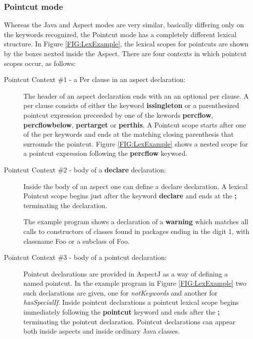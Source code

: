 \subsubsection{{\sc Pointcut} mode}
Whereas the {\sc Java} and {\sc Aspect} modes are very similar, basically
differing only on the keywords recognized, the {\sc Pointcut} mode
has a completely different lexical structure.   
In Figure \ref{FIG:LexExample},  the lexical scopes for pointcuts are
shown by the boxes nexted inside the Aspect.   There are four contexts in
which pointcut scopes occur, as follows:

\begin{description}
\item[Pointcut Context \#1 - a Per clause in an aspect declaration:]
The header of an aspect
declaration ends with an an optional per clause.  A per clause consists
of either the keyword {\bf issingleton} or  a parenthesized pointcut
expression preceeded by one of the kewords {\bf percflow}, 
{\bf percflowbelow}, {\bf pertarget} or {\bf perthis}.    
A {\sc Pointcut} scope starts after one of the per keywords and ends at
the matching closing parenthesis that surrounds the pointcut.   Figure
\ref{FIG:LexExample} shows a nested scope for a pointcut expression 
following the {\bf percflow} keyword.

\item[Pointcut Context \#2 - body of a {\bf declare} declaration:]
Inside the body of an aspect one can define
a declare declaration.   A lexical {\sc Pointcut} scope begins just after
the keyword {\bf declare} and ends at the {\bf ;} terminating the 
declaration.  

The example program shows a  
declaration of  a {\bf warning} which matches all calls to constructors of
classes found in packages ending in the digit 1, with classname Foo or
a subclass of Foo. 

\item[Pointcut Context \#3 - body of a pointcut declaration:]

Pointcut declarations are provided in AspectJ as a way of 
defining a named pointcut.  In the example program in 
Figure \ref{FIG:LexExample} two such declarations are given, one
for {\em notKeywords} and another for {\em hasSpecialIf}.   
Inside pointcut declarations a pointcut lexical scope begins
immediately following the {\bf pointcut} keyword and ends 
after the {\bf ;} terminating the pointcut declaration.
Pointcut declarations can appear both inside aspects and inside
ordinary Java classes.


\end{description}
